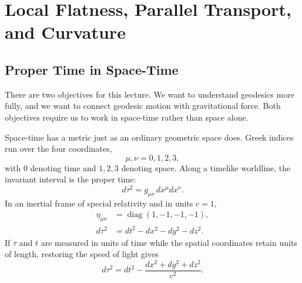 \chapter{Local Flatness, Parallel Transport, and Curvature}


\section{Proper Time in Space-Time}

There are two objectives for this lecture. We want to understand geodesics
more fully, and we want to connect geodesic motion with gravitational
force. Both objectives require us to work in space-time rather than space
alone.

Space-time has a metric just as an ordinary geometric space does. Greek
indices run over the four coordinates,
\begin{equation}
  \mu,\nu=0,1,2,3,
\end{equation}
with \(0\) denoting time and \(1,2,3\) denoting space. Along a timelike
worldline, the invariant interval is the proper time:
\begin{equation}
  d\tau^2=g_{\mu\nu}\,dx^\mu dx^\nu.
  \label{eq:l06-proper-time}
\end{equation}
In an inertial frame of special relativity and in units \(c=1\),
\begin{equation}
  \begin{aligned}
    \eta_{\mu\nu}
    &=
    \operatorname{diag}(1,-1,-1,-1),\\
    d\tau^2
    &=
    dt^2-dx^2-dy^2-dz^2.
  \end{aligned}
  \label{eq:l06-minkowski}
\end{equation}
If \(\tau\) and \(t\) are measured in units of time while the spatial
coordinates retain units of length, restoring the speed of light gives
\begin{equation}
  d\tau^2
  =
  dt^2-\frac{dx^2+dy^2+dz^2}{c^2}.
  \label{eq:l06-c-restored}
\end{equation}

